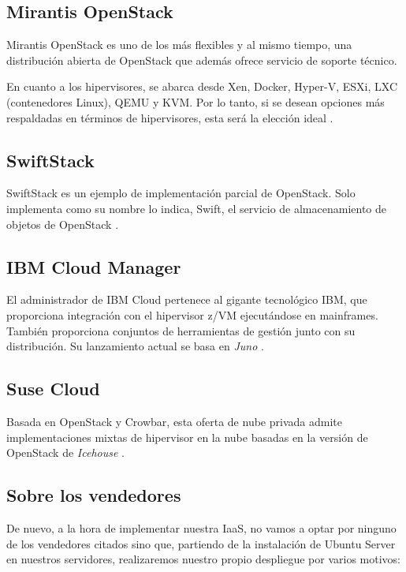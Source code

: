 \subsection{Mirantis OpenStack}
Mirantis OpenStack es uno de los más flexibles y al mismo tiempo, una distribución abierta de OpenStack que además ofrece servicio de soporte técnico.

En cuanto a los hipervisores, se abarca desde Xen, Docker, Hyper-V, ESXi, LXC (contenedores Linux), QEMU y KVM. Por lo tanto, si se desean opciones más respaldadas en términos de hipervisores, esta será la elección ideal \cite{noauthor_mirantis_nodate}.

\subsection{SwiftStack}
SwiftStack es un ejemplo de implementación parcial de OpenStack. Solo implementa como su nombre lo indica, Swift, el servicio de almacenamiento de objetos de OpenStack \cite{noauthor_swiftstack_nodate}.

\subsection{IBM Cloud Manager}
El administrador de IBM Cloud pertenece al gigante tecnológico IBM, que proporciona integración con el hipervisor z/VM ejecutándose en mainframes. También proporciona conjuntos de herramientas de gestión junto con su distribución. Su lanzamiento actual se basa en \textit{Juno} \cite{peterson2700042wjc_ibm_2009}.

\subsection{Suse Cloud}
Basada en OpenStack y Crowbar, esta oferta de nube privada admite implementaciones mixtas de hipervisor en la nube basadas en la versión de OpenStack de \textit{Icehouse} \cite{noauthor_suse_nodate}.

\subsection{Sobre los vendedores}
De nuevo, a la hora de implementar nuestra IaaS, no vamos a optar por ninguno de los vendedores citados sino que, partiendo de la instalación de Ubuntu Server en nuestros servidores, realizaremos nuestro propio despliegue por varios motivos:


